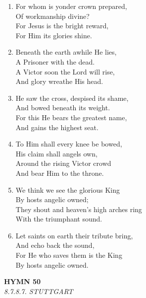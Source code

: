 \documentclass[11pt,a4paper]{article}
\begin{document}
\begin{enumerate}
    \item For whom is yonder crown prepared, \\
        Of workmanship divine? \\
        For Jesus is the bright reward, \\
        For Him its glories shine.

    \item Beneath the earth awhile He lies, \\
        A Prisoner with the dead. \\
        A Victor soon the Lord will rise, \\
        And glory wreathe His head.

    \item He saw the cross, despised its shame, \\
        And bowed beneath its weight. \\
        For this He bears the greatest name, \\
        And gains the highest seat.

    \item To Him shall every knee be bowed, \\
        His claim shall angels own, \\
        Around the rising Victor crowd \\
        And bear Him to the throne.

    \item We think we see the glorious King \\
        By hosts angelic owned; \\
        They shout and heaven's high arches ring \\
        With the triumphant sound.

    \item Let saints on earth their tribute bring, \\
        And echo back the sound, \\
        For He who saves them is the King \\
        By hosts angelic owned.

\end{enumerate}

\newpage
\begin{center}
    {\Large \textbf{HYMN 50}}
    \\
    \textit{8.7.8.7. STUTTGART}
\end{center}
\vspace{1em}
\end{document}
